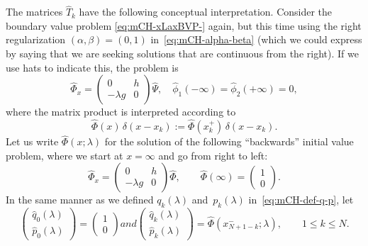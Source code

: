 \documentclass[10pt,a4paper]{article} \pdfoutput=1 
\begin{document}
The matrices $\widehat T_k$ have the following conceptual interpretation.
Consider the boundary value problem \eqref{eq:mCH-xLaxBVP-} again,
but this time using the right regularization $(\alpha, \beta) = (0,1)$ in~\eqref{eq:mCH-alpha-beta}
(which we could express by saying that we are seeking solutions that are continuous from the right).
If we use hats to indicate this, the problem is
\begin{equation} \label{eq:mCH-xLaxBVP+}
  \widehat\Phi_x = \begin{pmatrix} 0 & h \\ -\lambda g & 0 \end{pmatrix} \widehat\Psi
  , \quad
  \widehat\phi_1(-\infty) = \widehat\phi_2(+\infty) = 0
  ,
\end{equation}
where the matrix product is interpreted according to
\begin{equation}
  \label{eq:mCH-right-regularization}
  \widehat\Phi(x) \, \delta(x-x_k) := \widehat\Phi(x_k^+) \, \delta(x-x_k)
  .
\end{equation}
Let us write $\widehat\Phi(x;\lambda)$ for the solution of the following
``backwards'' initial value problem, where we start at $x=\infty$
and go from right to left:
\begin{equation}\label{eq:mCH-xLax+}
  \widehat\Phi_x =
  \begin{pmatrix} 0 & h \\ -\lambda g & 0 \end{pmatrix}
  \widehat\Phi
  , \qquad
  \widehat\Phi(\infty) =
  \begin{pmatrix} 1 \\ 0 \end{pmatrix}
  .
\end{equation}
In the same manner as we defined $q_k(\lambda)$ and~$p_k(\lambda)$ in~\eqref{eq:mCH-def-q-p}, let
\begin{subequations}
\begin{equation}
  \begin{pmatrix} \widehat q_0(\lambda) \\ \widehat p_0(\lambda) \end{pmatrix}
  =
  \begin{pmatrix} 1 \\ 0 \end{pmatrix}
\end{equation}
and
\begin{equation}
  \label{eq:mCH-def-qhat-phat}
  \begin{pmatrix} \widehat q_k(\lambda) \\ \widehat p_k(\lambda) \end{pmatrix}
  =
  \widehat\Phi(x_{N+1-k}^-;\lambda)
  ,\qquad
  1 \le k \le N
  .
\end{equation}
\end{subequations}
\end{document}
